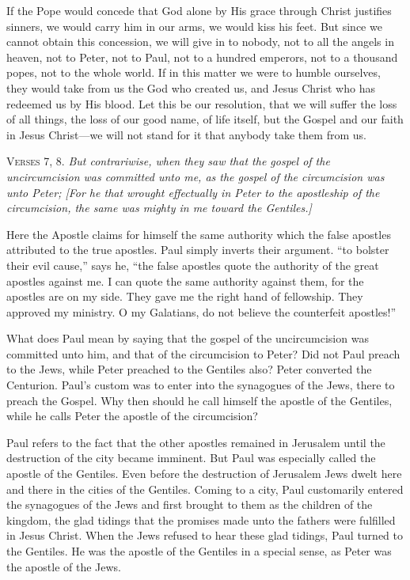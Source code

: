 If the Pope would concede that God alone by His grace through Christ justifies sinners, we would carry him in our arms, we would kiss his feet. But since we cannot obtain this concession, we will give in to nobody, not to all the angels in heaven, not to Peter, not to Paul, not to a hundred emperors, not to a thousand popes, not to the whole world. If in this matter we were to humble ourselves, they would take from us the God who created us, and Jesus Christ who has redeemed us by His blood. Let this be our resolution, that we will suffer the loss of all things, the loss of our good name, of life itself, but the Gospel and our faith in Jesus Christ—we will not stand for it that anybody take them from us.

\textsc{Verses} 7, 8. \emph{But contrariwise, when they saw that the gospel of the uncircumcision was committed unto me, as the gospel of the circumcision was unto Peter; [For he that wrought effectually in Peter to the apostleship of the circumcision, the same was mighty in me toward the Gentiles.]}

Here the Apostle claims for himself the same authority which the false apostles attributed to the true apostles. Paul simply inverts their argument. “to bolster their evil cause,” says he, “the false apostles quote the authority of the great apostles against me. I can quote the same authority against them, for the apostles are on my side. They gave me the right hand of fellowship. They approved my ministry. O my Galatians, do not believe the counterfeit apostles!”

What does Paul mean by saying that the gospel of the uncircumcision was committed unto him, and that of the circumcision to Peter? Did not Paul preach to the Jews, while Peter preached to the Gentiles also? Peter converted the Centurion. Paul’s custom was to enter into the synagogues of the Jews, there to preach the Gospel. Why then should he call himself the apostle of the Gentiles, while he calls Peter the apostle of the circumcision?

Paul refers to the fact that the other apostles remained in Jerusalem until the destruction of the city became imminent. But Paul was especially called the apostle of the Gentiles. Even before the destruction of Jerusalem Jews dwelt here and there in the cities of the Gentiles. Coming to a city, Paul customarily entered the synagogues of the Jews and first brought to them as the children of the kingdom, the glad tidings that the promises made unto the fathers were fulfilled in Jesus Christ. When the Jews refused to hear these glad tidings, Paul turned to the Gentiles. He was the apostle of the Gentiles in a special sense, as Peter was the apostle of the Jews.

